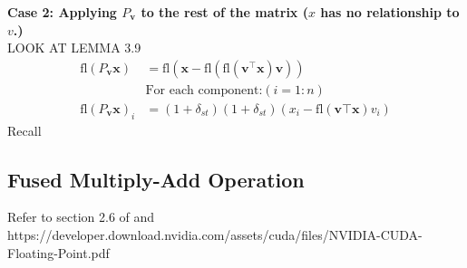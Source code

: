 \documentclass{article}
\newcommand{\dd}{\delta}
\newcommand{\bb}[1]{\mathbf{#1}}
\newcommand{\fl}{\mathrm{fl}}
\theoremstyle{definition}
\begin{document}
\textbf{Case 2: Applying $P_{\bb{v}}$ to the rest of the matrix ($x$ has no relationship to $v$.)}\\  
LOOK AT LEMMA 3.9
\begin{align*}
    \fl(P_{\bb{v}} \bb{x}) &= \fl(\bb{x}-\fl(\fl(\bb{v}^{\top}\bb{x}) \bb{v}))\\
    &\text{For each component:} (i = 1 : n)\\
    \fl(P_{\bb{v}} \bb{x})_i &= (1+\dd_{st})(1+\dd_{st})(x_i-\fl{(\bb{v}{\top}\bb{x})}v_i)
\end{align*}
Recall 

\subsection{Fused Multiply-Add Operation}
Refer to section 2.6 of \cite{Higham2002} and https://developer.download.nvidia.com/assets/cuda/files/NVIDIA-CUDA-Floating-Point.pdf



\clearpage


\end{document}
